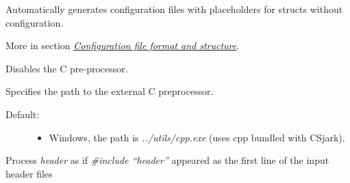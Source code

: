 \documentclass[A4paper,10pt,english]{sphinxmanual}
\begin{document}

\begin{fulllineitems}
\label{user/use:cmdoption-p}
Automatically generates configuration files with placeholders for structs without configuration.

More in section {\hyperref[user/config:configfile]{\emph{Configuration file format and structure}}}.

\end{fulllineitems}


\begin{fulllineitems}
\label{user/use:cmdoption-n}
Disables the C pre-processor.

\end{fulllineitems}


\begin{fulllineitems}
\label{user/use:cmdoption-C}
Specifies the path to the external C preprocessor.
\begin{description}
\item[{Default:}] \leavevmode\begin{itemize}
\item {} 
Windows, the path is \emph{../utils/cpp.exe} (uses cpp bundled with CSjark).

\end{itemize}

\end{description}

\end{fulllineitems}


\begin{fulllineitems}
\label{user/use:cmdoption-i}
Process \emph{header} as if \emph{\#include ``header''} appeared as the first line of the input header files

\end{fulllineitems}
\end{document}
